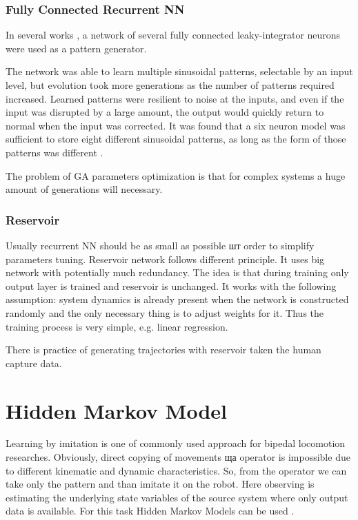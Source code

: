 \documentclass[11pt,a4paper]{report}
\begin{document}
				\subsubsection{Fully Connected Recurrent NN}
					In several works \cite{reil2002evolution}, \cite{petridis1994recurrent} a network of several fully connected leaky-integrator neurons were used as a pattern generator. 
					
					The network was able to learn multiple sinusoidal patterns, selectable by an input level, but evolution took more generations as the number of patterns required increased. Learned patterns were resilient to noise at the inputs, and even if the input was disrupted by a large amount, the output would quickly return to normal when the input was corrected. It was found that a six neuron model was sufficient to store eight different sinusoidal patterns, as long as the form of those patterns was different \cite{wright2014intelligent}.
					
					The problem of GA parameters optimization is that for complex systems a huge amount of generations will necessary. 
				\subsubsection{Reservoir}
					Usually recurrent NN should be as small as possible шт order to simplify parameters tuning. Reservoir network follows different principle. It uses big network with potentially much redundancy. The idea is that during training only output layer is trained and reservoir is unchanged. It works with the following assumption: system dynamics is already present when the network is constructed randomly and the only necessary thing is to adjust weights for it. Thus the training process is very simple, e.g. linear regression.
					
					There is practice \cite{wyffels2009design} of generating trajectories with reservoir taken the human capture data.
		\section{Hidden Markov Model}
			Learning by imitation is one of commonly used approach for bipedal locomotion researches. Obviously, direct copying of movements ща operator is impossible due to different kinematic and dynamic characteristics. So, from the operator we can take only the pattern and than imitate it on the robot. Here observing is estimating the underlying state variables of the source system where only output data is available. For this task Hidden Markov Models can be used \cite{inamura2004embodied}. 
			
\end{document}
